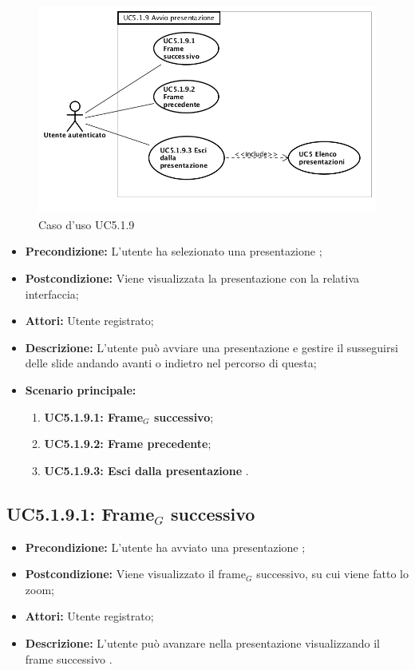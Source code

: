 \begin{figure}[h]
	\begin{center}
	\includegraphics[scale=0.4]{diagram/UC5-1-9.png}
	\caption{Caso d'uso UC5.1.9}
	\end{center}
\end{figure}
\begin{itemize}
	\item \textbf{Precondizione:} L'utente ha selezionato una presentazione ;
	\item \textbf{Postcondizione:} Viene visualizzata la presentazione con la relativa interfaccia;
	\item \textbf{Attori:} Utente registrato;
	\item \textbf{Descrizione:} L'utente può avviare una presentazione e gestire il susseguirsi delle slide andando avanti o indietro nel percorso di questa;
	\item \textbf{Scenario principale:}
	\begin{enumerate}
		\item \textbf{ UC5.1.9.1: Frame$_G$ successivo};
		\item \textbf{ UC5.1.9.2: Frame precedente};
		\item \textbf{ UC5.1.9.3: Esci dalla presentazione }.
	\end{enumerate}
\end{itemize}
\subsection{ UC5.1.9.1: Frame$_G$ successivo}

\begin{itemize}
	\item \textbf{Precondizione:} L'utente ha avviato una presentazione ;
	\item \textbf{Postcondizione:} Viene visualizzato il frame$_G$ successivo, su cui viene fatto lo zoom;
	\item \textbf{Attori:} Utente registrato;
	\item \textbf{Descrizione:} L'utente può avanzare nella presentazione visualizzando il frame successivo .
\end{itemize}

